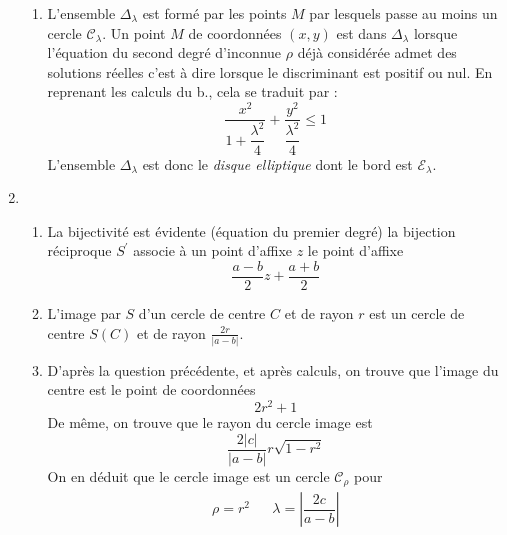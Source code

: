 \begin{enumerate}
\begin{enumerate}
\item L'ensemble $\Delta_\lambda$ est formé par les points $M$ par lesquels passe au moins un cercle $\mathcal C_\lambda$. Un point $M$ de coordonnées $(x,y)$ est dans $\Delta_\lambda$ lorsque l'équation du second degré d'inconnue $\rho$ déjà considérée admet des solutions réelles c'est à dire lorsque le discriminant est positif ou nul. En reprenant les calculs du b., cela se traduit par :
\begin{displaymath}
 \dfrac{x^2}{1+\dfrac{\lambda^2}{4}} + \dfrac{y^2}{\dfrac{\lambda^2}{4}} \leq 1
\end{displaymath}
L'ensemble $\Delta_\lambda$ est donc le \emph{disque elliptique}  dont le bord est $\mathcal E_\lambda$.
\end{enumerate}

\item \begin{enumerate}
 \item La bijectivité est évidente (équation du premier degré) la bijection réciproque $S^\prime$ associe à un point d'affixe $z$ le point d'affixe
\begin{displaymath}
 \dfrac{a-b}{2}z + \dfrac{a+b}{2}
\end{displaymath}
\item L'image par $S$ d'un cercle de centre $C$ et de rayon $r$ est un cercle de centre $S(C)$ et de rayon $\frac{2r}{|a-b|}$.
\item D'après la question précédente, et après calculs, on trouve que l'image du centre est le point de coordonnées
\begin{displaymath}
 2r^2 + 1
\end{displaymath}
 De même, on trouve que le rayon du cercle image est
\begin{displaymath}
 \dfrac{2|c|}{|a-b|}r\sqrt{1 - r^2}
\end{displaymath}
On en déduit que le cercle image est un cercle $\mathcal C_\rho$ pour
\begin{align*}
 \rho = r^2 & & \lambda = \left\vert \dfrac{2c}{a-b}\right \vert
\end{align*}
\end{enumerate}


\end{enumerate}

